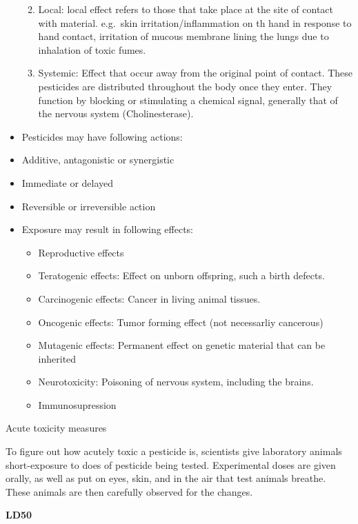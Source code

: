 \documentclass[]{book}
\providecommand{\tightlist}{%
  \setlength{\itemsep}{0pt}\setlength{\parskip}{0pt}}
\begin{document}
\begin{itemize}
  \begin{enumerate}
  \def\labelenumi{\arabic{enumi}.}
  \tightlist
  \item
    Local: local effect refers to those that take place at the site of contact with material. e.g.~skin irritation/inflammation on th hand in response to hand contact, irritation of mucous membrane lining the lungs due to inhalation of toxic fumes.
  \item
    Systemic: Effect that occur away from the original point of contact. These pesticides are distributed throughout the body once they enter. They function by blocking or stimulating a chemical signal, generally that of the nervous system (Cholinesterase).
  \end{enumerate}
\item
  Pesticides may have following actions:
\item
  Additive, antagonistic or synergistic
\item
  Immediate or delayed
\item
  Reversible or irreversible action
\item
  Exposure may result in following effects:

  \begin{itemize}
  \tightlist
  \item
    Reproductive effects
  \item
    Teratogenic effects: Effect on unborn offspring, such a birth defects.
  \item
    Carcinogenic effects: Cancer in living animal tissues.
  \item
    Oncogenic effects: Tumor forming effect (not necessarliy cancerous)
  \item
    Mutagenic effects: Permanent effect on genetic material that can be inherited
  \item
    Neurotoxicity: Poisoning of nervous system, including the brains.
  \item
    Immunosupression
  \end{itemize}
\end{itemize}

Acute toxicity measures

To figure out how acutely toxic a pesticide is, scientists give laboratory animals short-exposure to does of pesticide being tested. Experimental doses are given orally, as well as put on eyes, skin, and in the air that test animals breathe. These animals are then carefully observed for the changes.

\textbf{LD50}
\end{document}
